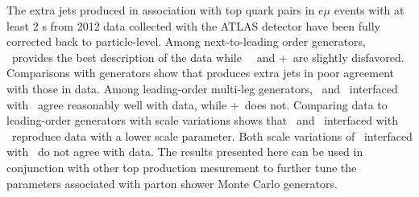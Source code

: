 The extra jets produced in association with top quark pairs in $e\mu$ events with at least 2 \bjet s from 2012 data collected with the ATLAS detector have been fully corrected back to particle-level. Among next-to-leading order generators, 
\hdamp\ provides the best description of the data while
\powpy\, \peight\ and \pow+\hw\ are slightly disfavored. Comparisons with generators show that \mcnlohw produces extra jets in poor agreement with those in data. Among leading-order multi-leg generators,  \madgraph\ and \alpg\ interfaced with \py\ agree reasonably well with data,  while \alpg+\hw\ does not. Comparing data to leading-order generators with scale variations shows  that \madgraph\ and \alpg\ interfaced with \py\ reproduce data with a lower scale parameter. Both scale variations of \acermc\ interfaced with \py\ do not agree with data. The results presented here can be used in conjunction with other top production mesurement to further tune the parameters associated with parton shower Monte Carlo generators.